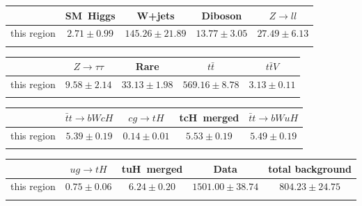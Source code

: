 \centering
\begin{tabular}{ccccc} \toprule\toprule
 & SM~Higgs & W+jets & Diboson & $Z\to ll$\\\midrule
this region & $2.71\pm0.99$ & $145.26\pm21.89$ & $13.77\pm3.05$ & $27.49\pm6.13$\\
\bottomrule\bottomrule\\
\end{tabular}
\begin{tabular}{ccccc} \toprule\toprule
 & $Z\to \tau\tau$ & Rare & $t\bar{t}$ & $t\bar{t}V$\\\midrule
this region & $9.58\pm2.14$ & $33.13\pm1.98$ & $569.16\pm8.78$ & $3.13\pm0.11$\\
\bottomrule\bottomrule\\
\end{tabular}
\begin{tabular}{ccccc} \toprule\toprule
 & $\bar{t}t\to bWcH$ & $cg\to tH$ & tcH~merged & $\bar{t}t\to bWuH$\\\midrule
this region & $5.39\pm0.19$ & $0.14\pm0.01$ & $5.53\pm0.19$ & $5.49\pm0.19$\\
\bottomrule\bottomrule\\
\end{tabular}
\begin{tabular}{ccccc} \toprule\toprule
 & $ug\to tH$ & tuH~merged & Data & total background\\\midrule
this region & $0.75\pm0.06$ & $6.24\pm0.20$ & $1501.00\pm38.74$ & $804.23\pm24.75$\\
\bottomrule\bottomrule\\
\end{tabular}
